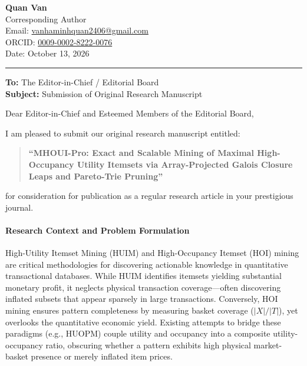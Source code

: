 \documentclass[11pt,a4paper]{article}
\begin{document}
\begin{flushleft}
    \textbf{Quan Van} \\
    Corresponding Author \\
    Email: \href{mailto:vanhaminhquan2406@gmail.com}{vanhaminhquan2406@gmail.com} \\
    ORCID: \href{https://orcid.org/0009-0002-8222-0076}{0009-0002-8222-0076} \\
    Date: October 13, 2026
\end{flushleft}

\vspace{0.5em}
\hrule
\vspace{1em}

\begin{flushleft}
    \textbf{To:} The Editor-in-Chief / Editorial Board \\
    \textbf{Subject:} Submission of Original Research Manuscript
\end{flushleft}

\vspace{1em}

Dear Editor-in-Chief and Esteemed Members of the Editorial Board,

I am pleased to submit our original research manuscript entitled:

\begin{quote}
\textbf{``MHOUI-Pro: Exact and Scalable Mining of Maximal High-Occupancy Utility Itemsets via Array-Projected Galois Closure Leaps and Pareto-Trie Pruning''}
\end{quote}

for consideration for publication as a regular research article in your prestigious journal.

\paragraph{Research Context and Problem Formulation}
High-Utility Itemset Mining (HUIM) and High-Occupancy Itemset (HOI) mining are critical methodologies for discovering actionable knowledge in quantitative transactional databases. While HUIM identifies itemsets yielding substantial monetary profit, it neglects physical transaction coverage---often discovering inflated subsets that appear sparsely in large transactions. Conversely, HOI mining ensures pattern completeness by measuring basket coverage ($|X|/|T|$), yet overlooks the quantitative economic yield. Existing attempts to bridge these paradigms (e.g., HUOPM) couple utility and occupancy into a composite utility-occupancy ratio, obscuring whether a pattern exhibits high physical market-basket presence or merely inflated item prices.
\end{document}
